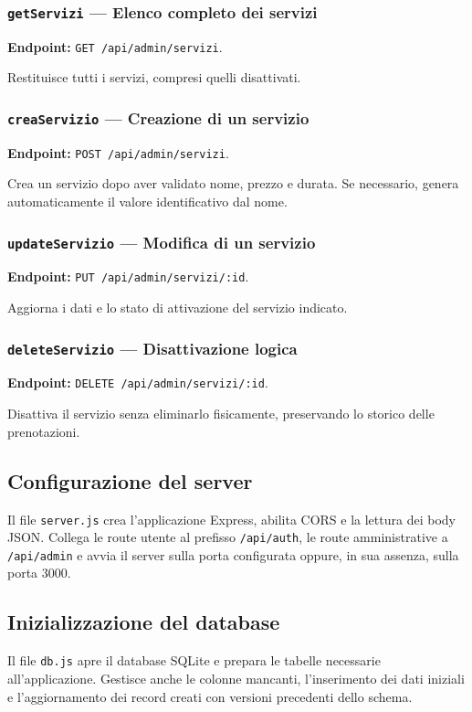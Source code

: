 \documentclass[12pt,a4paper]{article}
\begin{document}
\subsubsection{\texttt{getServizi} --- Elenco completo dei servizi}
\textbf{Endpoint:} \texttt{GET /api/admin/servizi}.

Restituisce tutti i servizi, compresi quelli disattivati.

\subsubsection{\texttt{creaServizio} --- Creazione di un servizio}
\textbf{Endpoint:} \texttt{POST /api/admin/servizi}.

Crea un servizio dopo aver validato nome, prezzo e durata. Se necessario,
genera automaticamente il valore identificativo dal nome.

\subsubsection{\texttt{updateServizio} --- Modifica di un servizio}
\textbf{Endpoint:} \texttt{PUT /api/admin/servizi/:id}.

Aggiorna i dati e lo stato di attivazione del servizio indicato.

\subsubsection{\texttt{deleteServizio} --- Disattivazione logica}
\textbf{Endpoint:} \texttt{DELETE /api/admin/servizi/:id}.

Disattiva il servizio senza eliminarlo fisicamente, preservando lo storico
delle prenotazioni.

\subsection{Configurazione del server}
Il file \texttt{server.js} crea l'applicazione Express, abilita CORS e la
lettura dei body JSON. Collega le route utente al prefisso
\texttt{/api/auth}, le route amministrative a \texttt{/api/admin} e avvia il
server sulla porta configurata oppure, in sua assenza, sulla porta 3000.

\subsection{Inizializzazione del database}
Il file \texttt{db.js} apre il database SQLite e prepara le tabelle necessarie
all'applicazione. Gestisce anche le colonne mancanti, l'inserimento dei dati
iniziali e l'aggiornamento dei record creati con versioni precedenti dello
schema.
\end{document}

